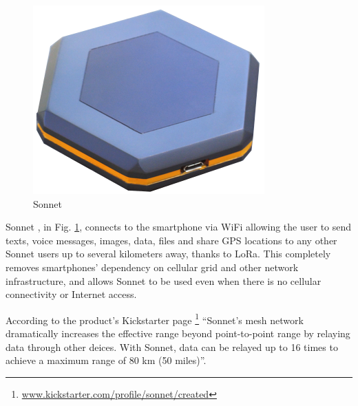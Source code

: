 				\begin{minipage}{0.38\textwidth}%
					\begin{figure}[H]
						\centering
						\includegraphics[width=.8\textwidth]{resources/img/chap4/sonnet}
						\caption{Sonnet}
						\label{img:sonnet}
					\end{figure}
				\end{minipage}%
				\hfill%
				\begin{minipage}{0.52\textwidth}\raggedright
					Sonnet \footnotemark, in Fig. \ref{img:sonnet}, connects to the smartphone via WiFi allowing the user to send texts, voice messages, images, data, files and share GPS locations to any other Sonnet users up to several kilometers away, thanks to LoRa.
					This completely removes smartphones' dependency on cellular grid and other network infrastructure, and allows Sonnet to be used even when there is no cellular connectivity or Internet access.
				\end{minipage}		
				\newline
			
				According to the product's Kickstarter page \footnote{ \url{www.kickstarter.com/profile/sonnet/created}} ``Sonnet's mesh network dramatically increases the effective range beyond point-to-point range by relaying data through other deices. With Sonnet, data can be relayed up to 16 times to achieve a maximum range of 80 km (50 miles)''.

